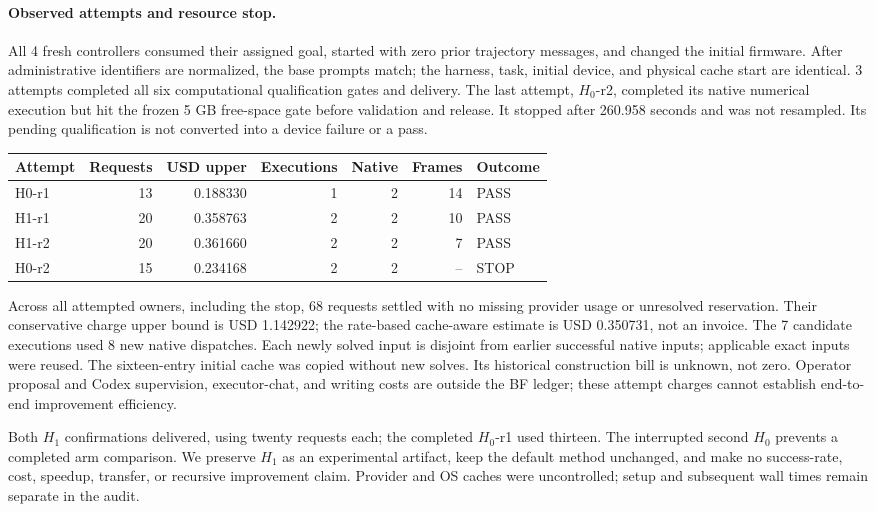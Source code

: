 
\paragraph{Observed attempts and resource stop.} All 4 fresh controllers consumed their assigned goal, started with zero prior trajectory messages, and changed the initial firmware. After administrative identifiers are normalized, the base prompts match; the harness, task, initial device, and physical cache start are identical. 3 attempts completed all six computational qualification gates and delivery. The last attempt, $H_0$-r2, completed its native numerical execution but hit the frozen 5 GB free-space gate before validation and release. It stopped after 260.958 seconds and was not resampled. Its pending qualification is not converted into a device failure or a pass.
\begin{center}
{\small\begin{tabular}{lrrrrrl}
\toprule
Attempt & Requests & USD upper & Executions & Native & Frames & Outcome\\
\midrule
H0-r1 & 13 & 0.188330 & 1 & 2 & 14 & PASS\\
H1-r1 & 20 & 0.358763 & 2 & 2 & 10 & PASS\\
H1-r2 & 20 & 0.361660 & 2 & 2 & 7 & PASS\\
H0-r2 & 15 & 0.234168 & 2 & 2 & -- & STOP\\
\bottomrule
\end{tabular}}
\end{center}
Across all attempted owners, including the stop, 68 requests settled with no missing provider usage or unresolved reservation. Their conservative charge upper bound is USD 1.142922; the rate-based cache-aware estimate is USD 0.350731, not an invoice. The 7 candidate executions used 8 new native dispatches. Each newly solved input is disjoint from earlier successful native inputs; applicable exact inputs were reused. The sixteen-entry initial cache was copied without new solves. Its historical construction bill is unknown, not zero. Operator proposal and Codex supervision, executor-chat, and writing costs are outside the BF ledger; these attempt charges cannot establish end-to-end improvement efficiency.

Both $H_1$ confirmations delivered, using twenty requests each; the completed $H_0$-r1 used thirteen. The interrupted second $H_0$ prevents a completed arm comparison. We preserve $H_1$ as an experimental artifact, keep the default method unchanged, and make no success-rate, cost, speedup, transfer, or recursive improvement claim. Provider and OS caches were uncontrolled; setup and subsequent wall times remain separate in the audit.
